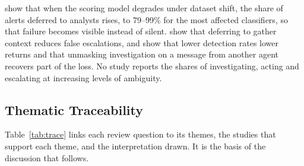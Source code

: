 \documentclass[pdflatex,sn-basic]{sn-jnl}
\begin{document}
\citet{sahin2026} show that when the scoring model degrades under dataset shift, the share of alerts deferred to analysts rises, to 79--99\% for the most affected classifiers, so that failure becomes visible instead of silent. \citet{kovtun2026} show that deferring to gather context reduces false escalations, and \citet{contractor2025} show that lower detection rates lower returns and that unmasking investigation on a message from another agent recovers part of the loss. No study reports the shares of investigating, acting and escalating at increasing levels of ambiguity.

\subsection{Thematic Traceability}\label{sec:trace}

Table~\ref{tab:trace} links each review question to its themes, the studies that support each theme, and the interpretation drawn. It is the basis of the discussion that follows.
\end{document}
